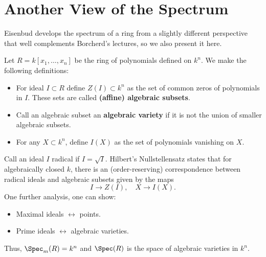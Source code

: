 \section{Another View of the Spectrum}

Eisenbud develops the spectrum of a ring from a slightly different perspective that well complements Borcherd's lectures, so we also present it here.

Let $R = k[x_1, \dots, x_n]$ be the ring of polynomials defined on $k^n$. We make the following definitions:
\begin{itemize}
    \item For ideal $I \subset R$ define $Z(I) \subset k^n$ as the set of common zeros of polynomials in $I$. These sets are called \textbf{(affine) algebraic subsets}.
    \item Call an algebraic subset an \textbf{algebraic variety} if it is not the union of smaller algebraic subsets.
    \item For any $X \subset k^n$, define $I(X)$ as the set of polynomials vanishing on $X$.
\end{itemize}
Call an ideal $I$ radical if $I = \sqrt{I}$. Hilbert's Nullstellensatz states that for algebraically closed $k$, there is an (order-reserving) correspondence between radical ideals and algebraic subsets given by the maps
\[
    I \to Z(I), \quad X \to I(X).
\]
One further analysis, one can show:
\begin{itemize}
    \item Maximal ideals $\leftrightarrow$ points.
    \item Prime ideals $\leftrightarrow$ algebraic varieties.
\end{itemize}
Thus, $\Spec_m(R) = k^n$ and $\Spec(R)$ is the space of algebraic varieties in $k^n$.

